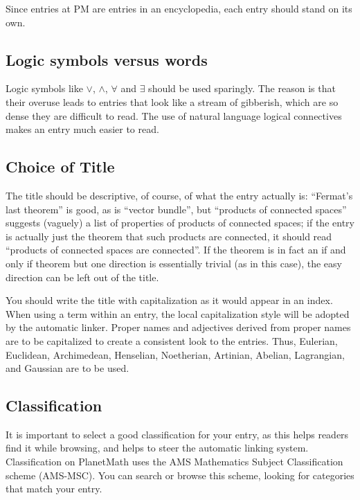 Since entries at PM are entries in an encyclopedia, each entry should
stand on its own.

\subsection{Logic symbols versus words}

Logic symbols like $\vee$, $\wedge$, $\forall$ and $\exists$ should be used sparingly. The reason is that their overuse leads to entries that look like a stream of gibberish, which are so dense they are difficult to read. The use of natural language logical connectives makes an entry much easier to read.

\subsection{Choice of Title}

The title should be descriptive, of course, of what the entry actually is: ``Fermat's last theorem'' is good, as is ``vector bundle'', but ``products of connected spaces'' suggests (vaguely) a list of properties of products of connected spaces; if the entry is actually just the theorem that such products are connected, it should read ``products of connected spaces are connected''. If the theorem is in fact an if and only if theorem but one direction is essentially trivial (as in this case), the easy direction can be left out of the title.

You should write the title with capitalization as it would appear in an index. When using a term within an entry, the local capitalization style will be adopted by the automatic linker. Proper names and adjectives derived from
proper names are to be capitalized to create a consistent look to the entries.
Thus, Eulerian, Euclidean, Archimedean, Henselian, Noetherian, Artinian,
Abelian, Lagrangian, and Gaussian are to be used.

\subsection{Classification}

It is important to select a good classification for your entry, as this helps readers find it while browsing, and helps to steer the automatic linking system. Classification on PlanetMath uses the AMS Mathematics Subject Classification scheme (AMS-MSC). You can search or browse this scheme, looking for categories that match your entry.

